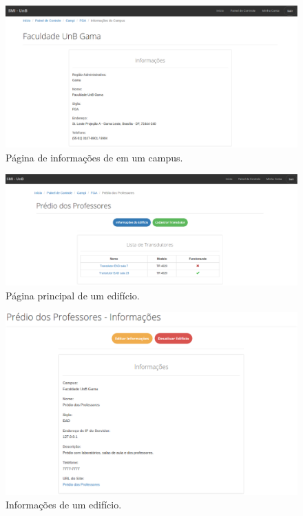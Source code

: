 \begin{apendicesenv}
\begin{figure}[!htpb]
    \centering
    \includegraphics[keepaspectratio=true,scale=0.35]{figuras/img9.eps}
    \caption{Página de informações de em um campus.}
    \label{img9}
\end{figure}

\begin{figure}[!htpb]
    \centering
    \includegraphics[keepaspectratio=true,scale=0.35]{figuras/img11.eps}
    \caption{Página principal de um edifício.}
    \label{img11}
\end{figure}

\begin{figure}[!htpb]
    \centering
    \includegraphics[keepaspectratio=true,scale=0.55]{figuras/img12.eps}
    \caption{Informações de um edifício.}
    \label{img12}
\end{figure}


\end{apendicesenv}
